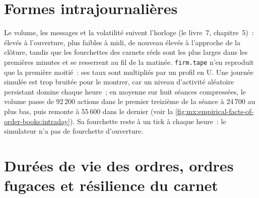 \section{Formes intrajournalières}

Le volume, les messages et la volatilité suivent l'horloge (le livre~7, chapitre~5)~: élevés à l'ouverture, plus faibles à midi, de nouveau élevés à l'approche de la clôture, tandis que
les fourchettes des carnets réels sont les plus larges dans les premières minutes et se resserrent au fil de la matinée. \texttt{firm.tape} n'en reproduit que la première moitié~: ses taux sont
multipliés par un profil en U. Une journée simulée est trop bruitée pour le montrer, car un niveau d'activité aléatoire persistant domine chaque heure~; en moyenne sur
huit séances compressées, le volume passe de 92\,200 actions dans le premier treizième de la séance à 24\,700 au plus bas, puis remonte à 55\,600 dans le
dernier (voir la \cref{fig:mx:empirical-facts-of-order-books:intraday}). Sa fourchette reste à un tick à chaque heure~: le simulateur n'a pas de fourchette d'ouverture.

\begin{omfigure}

\label{fig:mx:empirical-facts-of-order-books:intraday}
\end{omfigure}

\section{Durées de vie des ordres, ordres fugaces et résilience du carnet}

